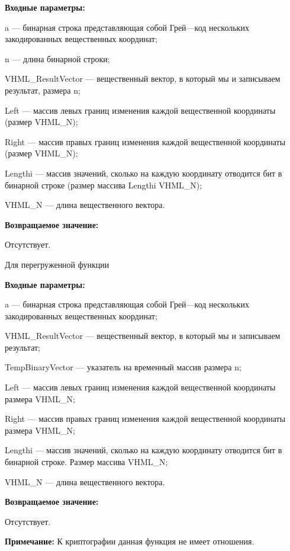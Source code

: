 \textbf{Входные параметры:}
 
a --- бинарная строка представляющая собой Грей---код нескольких закодированных вещественных координат;
 
n --- длина бинарной строки;
 
VHML\_ResultVector --- вещественный вектор, в который мы и записываем результат, размера n;
 
Left --- массив левых границ изменения каждой вещественной координаты (размер VHML\_N);
 
Right --- массив правых границ изменения каждой вещественной координаты (размер VHML\_N);
 
Lengthi --- массив значений, сколько на каждую координату отводится бит в бинарной строке (размер массива Lengthi VHML\_N);
 
VHML\_N --- длина вещественного вектора.
 

\textbf{Возвращаемое значение:}
 
Отсутствует.
  
Для перегруженной функции
  
\textbf{Входные параметры:}
 
a --- бинарная строка представляющая собой Грей---код нескольких закодированных вещественных координат;
 
VHML\_ResultVector --- вещественный вектор, в который мы и записываем результат;
 
TempBinaryVector --- указатель на временный массив  размера n;
 
Left --- массив левых границ изменения каждой вещественной координаты размера VHML\_N;
 
Right --- массив правых границ изменения каждой вещественной координаты размера VHML\_N;
 
Lengthi --- массив значений, сколько на каждую координату отводится бит в бинарной строке. Размер массива VHML\_N;
 
VHML\_N --- длина вещественного вектора.
 
\textbf{Возвращаемое значение:}
 
Отсутствует.

\textbf{Примечание:}
 К криптографии данная функция не имеет отношения.
